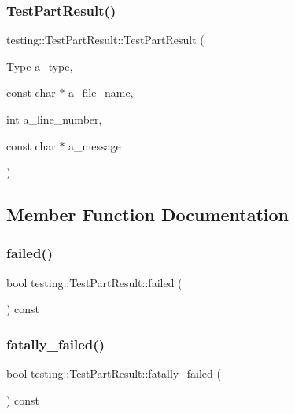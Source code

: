 \subsubsection{\texorpdfstring{TestPartResult()}{TestPartResult()}}
{\footnotesize\ttfamily testing\+::\+Test\+Part\+Result\+::\+Test\+Part\+Result (\begin{DoxyParamCaption}\item[{\mbox{\hyperlink{classtesting_1_1_test_part_result_a65ae656b33fdfdfffaf34858778a52d5}{Type}}}]{a\+\_\+type,  }\item[{const char $\ast$}]{a\+\_\+file\+\_\+name,  }\item[{int}]{a\+\_\+line\+\_\+number,  }\item[{const char $\ast$}]{a\+\_\+message }\end{DoxyParamCaption})\hspace{0.3cm}{\ttfamily [inline]}}



\subsection{Member Function Documentation}
\mbox{\label{classtesting_1_1_test_part_result_aa04b377c3e7ed57d39e882df5561ac90}} 
\subsubsection{\texorpdfstring{failed()}{failed()}}
{\footnotesize\ttfamily bool testing\+::\+Test\+Part\+Result\+::failed (\begin{DoxyParamCaption}{ }\end{DoxyParamCaption}) const\hspace{0.3cm}{\ttfamily [inline]}}

\mbox{\label{classtesting_1_1_test_part_result_a77db157eff9531c3c00c2420502f9a89}} 
\subsubsection{\texorpdfstring{fatally\_failed()}{fatally\_failed()}}
{\footnotesize\ttfamily bool testing\+::\+Test\+Part\+Result\+::fatally\+\_\+failed (\begin{DoxyParamCaption}{ }\end{DoxyParamCaption}) const\hspace{0.3cm}{\ttfamily [inline]}}


